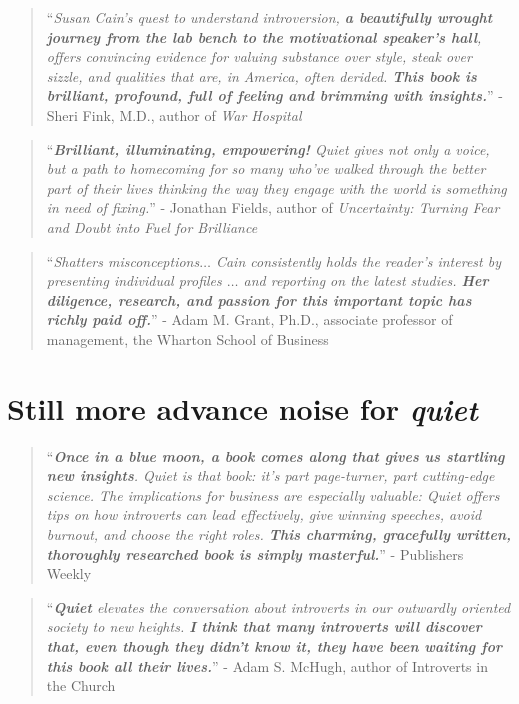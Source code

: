 \documentclass{book}
\numberwithin{equation}{section}
\begin{document}
\begin{quotation}
    ``\textit{Susan Cain's quest to understand introversion, \textbf{a beautifully wrought journey from the lab bench to the motivational speaker's hall}, offers convincing evidence for valuing substance over style, steak over sizzle, and qualities that are, in America, often derided. \textbf{This book is brilliant, profound, full of feeling and brimming with insights.}}'' - Sheri Fink, M.D., author of \textit{War Hospital}
\end{quotation}

\begin{quotation}
    ``\textit{\textbf{Brilliant, illuminating, empowering!} \emph{Quiet} gives not only a voice, but a path to homecoming for so many who've walked through the better part of their lives thinking the way they engage with the world is something in need of fixing.}'' - Jonathan Fields, author of \textit{Uncertainty: Turning Fear and Doubt into Fuel for Brilliance}
\end{quotation}

\begin{quotation}
    ``\textit{Shatters misconceptions$\ldots$ Cain consistently holds the reader's interest by presenting individual profiles $\ldots$ and reporting on the latest studies. \textbf{Her diligence, research, and passion for this important topic has richly paid off.}}'' - Adam M. Grant, Ph.D., associate professor of management, the Wharton School of Business
\end{quotation}

\section*{Still more advance noise for \textit{quiet}}

\begin{quotation}
    ``\textit{\textbf{Once in a blue moon, a book comes along that gives us startling new insights}. \emph{Quiet} is that book: it's part page-turner, part cutting-edge science. The implications for business are especially valuable: \emph{Quiet} offers tips on how introverts can lead effectively, give winning speeches, avoid burnout, and choose the right roles. \textbf{This charming, gracefully written, thoroughly researched book is simply masterful.}}'' - Publishers Weekly
\end{quotation}

\begin{quotation}
    ``\textit{\textbf{Quiet} elevates the conversation about introverts in our outwardly oriented society to new heights. \textbf{I think that many introverts will discover that, even though they didn't know it, they have been waiting for this book all their lives.}}'' - Adam S. McHugh, author of Introverts in the Church
\end{quotation}
\end{document}

